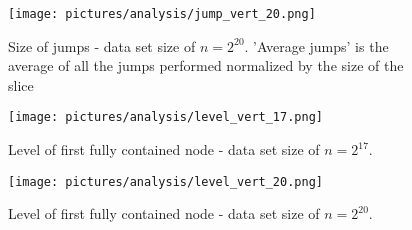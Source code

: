 \begin{figure}[h]
    \centering
    \texttt{[image: pictures/analysis/jump\_vert\_20.png]}
    \caption{Size of jumps - data set size of $n=2^{20}$. 'Average jumps' is the average of all the jumps performed normalized by the size of the slice}\label{fig:jump_vert_20}
\end{figure}



\begin{figure}[h]
    \centering
    \texttt{[image: pictures/analysis/level\_vert\_17.png]}
    \caption{Level of first fully contained node - data set size of $n=2^{17}$.}\label{fig:level_vert_17}
\end{figure}

\begin{figure}[h]
    \centering
    \texttt{[image: pictures/analysis/level\_vert\_20.png]}
    \caption{Level of first fully contained node - data set size of $n=2^{20}$.}\label{fig:level_vert_20}
\end{figure}


